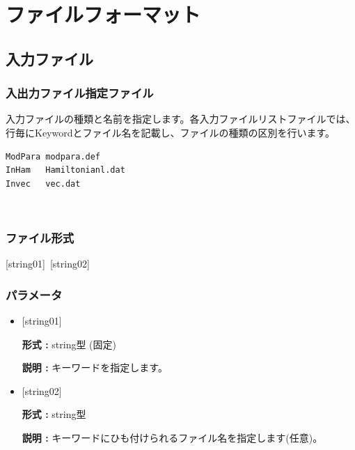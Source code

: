 \documentclass[12pt,titlepage]{jarticle}
\begin{document}
\newpage
\section{ファイルフォーマット}\label{Sec:FileFormat}

\subsection{入力ファイル}
\subsubsection{入出力ファイル指定ファイル}
入力ファイルの種類と名前を指定します。各入力ファイルリストファイルでは、行毎にKeywordとファイル名を記載し、ファイルの種類の区別を行います。\\
\begin{minipage}{15cm}
\begin{screen}
\begin{verbatim}
ModPara modpara.def
InHam   Hamiltonianl.dat
Invec   vec.dat
\end{verbatim}
\end{screen}
\end{minipage}
\\

\subsubsection{ファイル形式}
[string01]~[string02]
\subsubsection{パラメータ}
 \begin{itemize}
   \item  $[$string01$]$
   
   {\bf 形式 :} string型 (固定)
   
   {\bf 説明 :} キーワードを指定します。
   
   \item  $[$string02$]$
   
    {\bf 形式 :} string型 

   {\bf 説明 :} キーワードにひも付けられるファイル名を指定します(任意)。
 \end{itemize}
 
\end{document}
